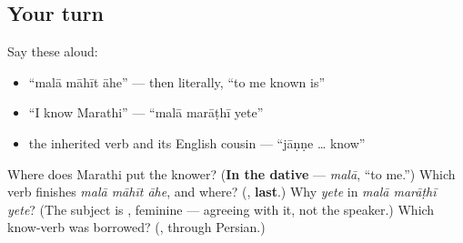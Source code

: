 \subsection*{Your turn}
Say these aloud:

\begin{itemize}
\raggedright
  \item \textquotedblleft{}malā māhīt āhe\textquotedblright{} — then literally, \textquotedblleft{}to me known is\textquotedblright{}
  \item \textquotedblleft{}I know Marathi\textquotedblright{} — \textquotedblleft{}malā marāṭhī yete\textquotedblright{}
  \item the inherited verb and its English cousin — \textquotedblleft{}jāṇṇe … know\textquotedblright{}
\end{itemize}

\begin{tcolorbox}[breakable,colback=teal!4,colframe=teal!35!black,title={Before you move on}]
Where does Marathi put the knower? (\textbf{In the dative} — \emph{malā}, \textquotedblleft{}to me.\textquotedblright{}) Which verb finishes \emph{malā māhīt āhe}, and where? (\textbf{}, \textbf{last}.) Why \emph{yete} in \emph{malā marāṭhī yete}? (The subject is \textbf{}, feminine — agreeing with it, not the speaker.) Which know-verb was borrowed? (\textbf{}, through Persian.)
\end{tcolorbox}
